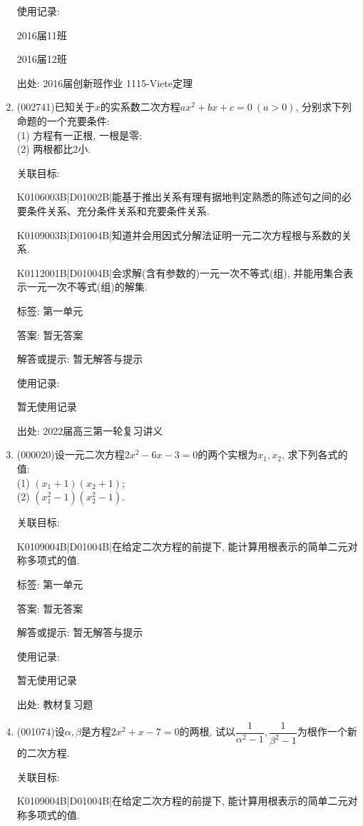 \documentclass[10pt,a4paper]{article}
\begin{document}
\begin{enumerate}[1.]
使用记录:

2016届11班	

2016届12班	


出处: 2016届创新班作业	1115-Viete定理
\item { (002741)}已知关于$x$的实系数二次方程$a x^2 +bx+c=0\ (a>0)$, 分别求下列命题的一个充要条件:\\
(1) 方程有一正根, 一根是零;\\
(2) 两根都比$2$小.


关联目标:

K0106003B|D01002B|能基于推出关系有理有据地判定熟悉的陈述句之间的必要条件关系、充分条件关系和充要条件关系.

K0109003B|D01004B|知道并会用因式分解法证明一元二次方程根与系数的关系.

K0112001B|D01004B|会求解(含有参数的)一元一次不等式(组), 并能用集合表示一元一次不等式(组)的解集.



标签: 第一单元

答案: 暂无答案

解答或提示: 暂无解答与提示

使用记录:

暂无使用记录


出处: 2022届高三第一轮复习讲义
\item { (000020)}设一元二次方程$2x^2-6x-3=0$的两个实根为$x_1,x_2$, 求下列各式的值:\\
(1) $(x_1+1)(x_2+1)$;\\
(2) $(x_1^2-1)(x_2^2-1)$.


关联目标:

K0109004B|D01004B|在给定二次方程的前提下, 能计算用根表示的简单二元对称多项式的值.



标签: 第一单元

答案: 暂无答案

解答或提示: 暂无解答与提示

使用记录:

暂无使用记录


出处: 教材复习题
\item { (001074)}设$\alpha,\beta$是方程$2x^2+x-7=0$的两根, 试以$\dfrac{1}{\alpha^2-1},\dfrac{1}{\beta^2-1}$为根作一个新的二次方程.


关联目标:

K0109004B|D01004B|在给定二次方程的前提下, 能计算用根表示的简单二元对称多项式的值.




\end{enumerate}
\end{document}
